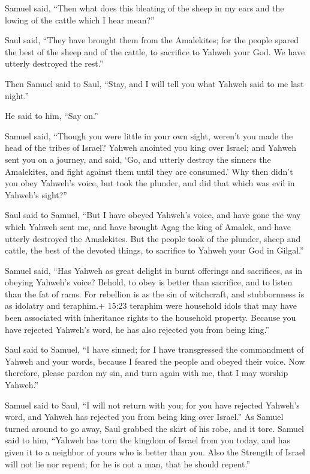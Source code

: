  Samuel said, ``Then what does this bleating of the sheep
in my ears and the lowing of the cattle which I hear mean?''

 Saul said, ``They have brought them from the Amalekites;
for the people spared the best of the sheep and of the cattle, to
sacrifice to Yahweh your God. We have utterly destroyed the rest.''

 Then Samuel said to Saul, ``Stay, and I will tell you what
Yahweh said to me last night.''

He said to him, ``Say on.''

 Samuel said, ``Though you were little in your own sight,
weren't you made the head of the tribes of Israel? Yahweh anointed you
king over Israel;  and Yahweh sent you on a journey, and
said, `Go, and utterly destroy the sinners the Amalekites, and fight
against them until they are consumed.'  Why then didn't you
obey Yahweh's voice, but took the plunder, and did that which was evil
in Yahweh's sight?''

 Saul said to Samuel, ``But I have obeyed Yahweh's voice,
and have gone the way which Yahweh sent me, and have brought Agag the
king of Amalek, and have utterly destroyed the Amalekites. 
But the people took of the plunder, sheep and cattle, the best of the
devoted things, to sacrifice to Yahweh your God in Gilgal.''

 Samuel said, ``Has Yahweh as great delight in burnt
offerings and sacrifices, as in obeying Yahweh's voice? Behold, to obey
is better than sacrifice, and to listen than the fat of rams.
 For rebellion is as the sin of witchcraft, and
stubbornness is as idolatry and teraphim.+ 15:23 teraphim were household
idols that may have been associated with inheritance rights to the
household property. Because you have rejected Yahweh's word, he has also
rejected you from being king.''

 Saul said to Samuel, ``I have sinned; for I have
transgressed the commandment of Yahweh and your words, because I feared
the people and obeyed their voice.  Now therefore, please
pardon my sin, and turn again with me, that I may worship Yahweh.''

 Samuel said to Saul, ``I will not return with you; for you
have rejected Yahweh's word, and Yahweh has rejected you from being king
over Israel.''  As Samuel turned around to go away, Saul
grabbed the skirt of his robe, and it tore.  Samuel said to
him, ``Yahweh has torn the kingdom of Israel from you today, and has
given it to a neighbor of yours who is better than you. 
Also the Strength of Israel will not lie nor repent; for he is not a
man, that he should repent.''

